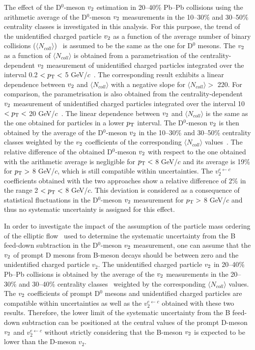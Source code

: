 \documentclass[11pt,a4paper]{article}
\providecommand{\pT}{$p_{\rm T}$ }
\providecommand{\vtwo}{$v_{\rm 2}$ }
\begin{document}
The effect of the D$^{0}$-meson \vtwo estimation in 20--40\% Pb--Pb collisions using the arithmetic average of the D$^{0}$-meson \vtwo measurements in the 10--30\% and 30--50\% centrality classes is investigated in this analysis.
For this purpose, the trend of the unidentified charged particle \vtwo as a function of the average number of binary collisions ($\langle N_{coll }\rangle$)~\cite{centralitypaper} is assumed to be the same as the one for D$^{0}$ mesons. 
The  \vtwo as a function of  $\langle N_{coll }\rangle$ is obtained from a parametrisation of the centrality-dependent \vtwo measurement of unidentified charged particles  integrated over the interval 0.2 $< p_{\rm T} <$ 5 GeV/$c$~\cite{lighthadronv23}. The corresponding result exhibits a linear dependence between \vtwo and $\langle N_{coll }\rangle$ with a negative slope for  $\langle N_{coll }\rangle >$ 220. For comparison, the parametrisation is also obtained from the centrality-dependent \vtwo measurement of unidentified charged particles  integrated over the interval 10 $< p_{\rm T} <$ 20 GeV/$c$~\cite{ALICEChpartv2}. The  linear dependence between \vtwo and $\langle N_{coll }\rangle$ is the same as the one obtained for particles in a lower \pT interval.
The D$^{0}$-meson \vtwo is then obtained by the average of the D$^{0}$-meson \vtwo in the 10--30\% and 30--50\% centrality classes weighted by the \vtwo coefficients of the corresponding $\langle N_{coll }\rangle$ values~\cite{centralitypaper}. 
The relative difference of the obtained D$^{0}$-meson \vtwo with respect to the one obtained with the arithmetic average is negligible for $p_{\rm T} <$ 8 GeV/$c$ and its average is 19\% for $p_{\rm T} >$ 8 GeV/$c$, which is still compatible within uncertainties.
The $v_{2}^{e \leftarrow c}$ coefficients obtained with the two approaches show a relative difference of 2\% in the range 2 $< p_{\rm T} <$ 8 GeV/$c$. 
This deviation is considered as a consequence of statistical fluctuations in the D$^{0}$-meson \vtwo measurement for $p_{\rm T} >$ 8 GeV/$c$  and thus no systematic uncertainty is assigned for this effect.

In order to investigate the impact of the assumption of the particle mass ordering of the elliptic flow~\cite{Evidencehydrobis} used to determine the systematic uncertainty from the B feed-down subtraction in the D$^{0}$-meson \vtwo measurement, one can assume that the  \vtwo of prompt D mesons from B-meson decays should be between zero and the unidentified charged particle $v_{2}$.  The unidentified charged particle \vtwo in 20--40\% Pb--Pb collisions is obtained by the average of the \vtwo measurements in the 20--30\% and 30--40\% centrality classes~\cite{ALICEChpartv2} weighted by the corresponding $\langle N_{coll }\rangle$ values. 
The \vtwo coefficients of  prompt D$^{0}$ mesons and unidentified charged particles are compatible within uncertainties as well as the $v_{2}^{e \leftarrow c}$ obtained with these two results. Therefore, the lower limit of the systematic uncertainty from the B feed-down subtraction can be positioned at the central values of the prompt D-meson \vtwo and $v_{2}^{e \leftarrow c}$ without strictly considering that the B-meson \vtwo is expected to be lower than the D-meson $v_{2}$.
\end{document}
